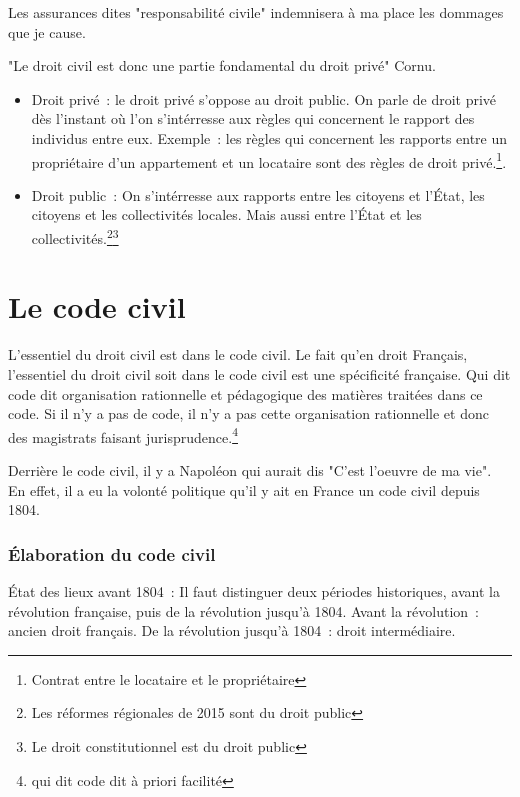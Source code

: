 Les assurances dites "responsabilité civile" indemnisera à ma place les dommages que je cause.

"Le droit civil est donc une partie fondamental du droit privé" Cornu. \newline

\begin{itemize}
\item Droit privé~: le droit privé s'oppose au droit public. On parle de droit privé dès l'instant où l'on s'intérresse aux règles qui concernent le rapport des individus entre eux. Exemple~: les règles qui concernent les rapports entre un propriétaire d'un appartement et un locataire sont des règles de droit privé.\footnote{Contrat entre le locataire et le propriétaire}.
\item Droit public~: On s'intérresse aux rapports entre les citoyens et l'État, les citoyens et les collectivités locales. Mais aussi entre l'État et les collectivités.\footnote{Les réformes régionales de 2015 sont du droit public}\footnote{Le droit constitutionnel est du droit public}
\end{itemize}



\part{Le code civil}

L'essentiel du droit civil est dans le code civil. Le fait qu'en droit Français, l'essentiel du droit civil soit dans le code civil est une spécificité française. Qui dit code dit organisation rationnelle et pédagogique des matières traitées dans ce code. Si il n'y a pas de code, il n'y a pas cette organisation rationnelle et donc des magistrats faisant jurisprudence.\footnote{qui dit code dit à priori facilité} \newline

Derrière le code civil, il y a Napoléon qui aurait dis "C'est l'oeuvre de ma vie". En effet, il a eu la volonté politique qu'il y ait en France un code civil depuis 1804. \newline

\section{Élaboration du code civil}

État des lieux avant 1804~: Il faut distinguer deux périodes historiques, avant la révolution française, puis de la révolution jusqu'à 1804. Avant la révolution~: ancien droit français. De la révolution jusqu'à 1804~: droit intermédiaire. \newline

